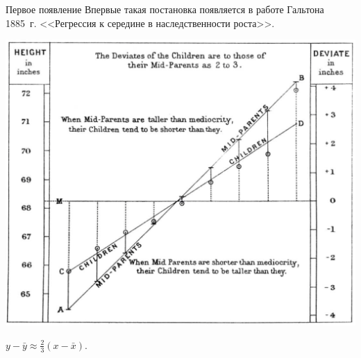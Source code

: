 \documentclass[9pt,pdf,utf8,hyperref={unicode},aspectratio=169]{beamer}
\begin{document}
\begin{frame}{Первое появление}
    Впервые такая постановка появляется в работе Гальтона 1885~г. <<Регрессия к середине в наследственности роста>>.

    \begin{center}
            \includegraphics[height=0.6\textheight]{galton.png}
    \end{center}

    $y-\bar{y} \approx \frac{2}{3} \left(x-\bar{x}\right).$
\end{frame}
\end{document}
